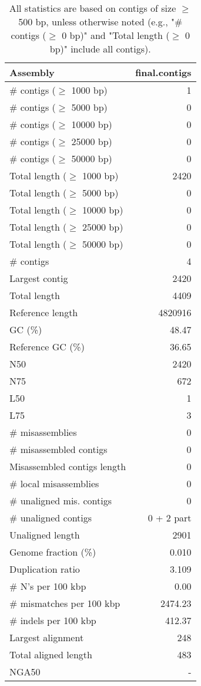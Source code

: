 \documentclass[12pt,a4paper]{article}
\begin{document}
\begin{table}[ht]
\begin{center}
\caption{All statistics are based on contigs of size $\geq$ 500 bp, unless otherwise noted (e.g., "\# contigs ($\geq$ 0 bp)" and "Total length ($\geq$ 0 bp)" include all contigs).}
\begin{tabular}{|l*{1}{|r}|}
\hline
Assembly & final.contigs \\ \hline
\# contigs ($\geq$ 1000 bp) & 1 \\ \hline
\# contigs ($\geq$ 5000 bp) & 0 \\ \hline
\# contigs ($\geq$ 10000 bp) & 0 \\ \hline
\# contigs ($\geq$ 25000 bp) & 0 \\ \hline
\# contigs ($\geq$ 50000 bp) & 0 \\ \hline
Total length ($\geq$ 1000 bp) & 2420 \\ \hline
Total length ($\geq$ 5000 bp) & 0 \\ \hline
Total length ($\geq$ 10000 bp) & 0 \\ \hline
Total length ($\geq$ 25000 bp) & 0 \\ \hline
Total length ($\geq$ 50000 bp) & 0 \\ \hline
\# contigs & 4 \\ \hline
Largest contig & 2420 \\ \hline
Total length & 4409 \\ \hline
Reference length & 4820916 \\ \hline
GC (\%) & 48.47 \\ \hline
Reference GC (\%) & 36.65 \\ \hline
N50 & 2420 \\ \hline
N75 & 672 \\ \hline
L50 & 1 \\ \hline
L75 & 3 \\ \hline
\# misassemblies & 0 \\ \hline
\# misassembled contigs & 0 \\ \hline
Misassembled contigs length & 0 \\ \hline
\# local misassemblies & 0 \\ \hline
\# unaligned mis. contigs & 0 \\ \hline
\# unaligned contigs & 0 + 2 part \\ \hline
Unaligned length & 2901 \\ \hline
Genome fraction (\%) & 0.010 \\ \hline
Duplication ratio & 3.109 \\ \hline
\# N's per 100 kbp & 0.00 \\ \hline
\# mismatches per 100 kbp & 2474.23 \\ \hline
\# indels per 100 kbp & 412.37 \\ \hline
Largest alignment & 248 \\ \hline
Total aligned length & 483 \\ \hline
NGA50 & - \\ \hline
\end{tabular}
\end{center}
\end{table}
\end{document}
